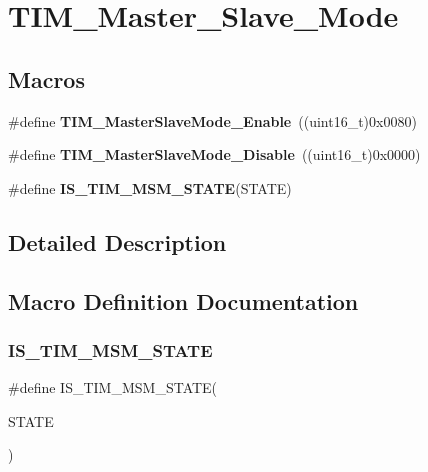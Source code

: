 \section{T\+I\+M\+\_\+\+Master\+\_\+\+Slave\+\_\+\+Mode}
\label{group__TIM__Master__Slave__Mode}
\subsection*{Macros}
\begin{DoxyCompactItemize}
\item 
\#define \textbf{ T\+I\+M\+\_\+\+Master\+Slave\+Mode\+\_\+\+Enable}~((uint16\+\_\+t)0x0080)
\item 
\#define \textbf{ T\+I\+M\+\_\+\+Master\+Slave\+Mode\+\_\+\+Disable}~((uint16\+\_\+t)0x0000)
\item 
\#define \textbf{ I\+S\+\_\+\+T\+I\+M\+\_\+\+M\+S\+M\+\_\+\+S\+T\+A\+TE}(S\+T\+A\+TE)
\end{DoxyCompactItemize}


\subsection{Detailed Description}


\subsection{Macro Definition Documentation}
\mbox{\label{group__TIM__Master__Slave__Mode_ga53146701cf287a0eca43b9232dffac60}} 
\subsubsection{I\+S\+\_\+\+T\+I\+M\+\_\+\+M\+S\+M\+\_\+\+S\+T\+A\+TE}
{\footnotesize\ttfamily \#define I\+S\+\_\+\+T\+I\+M\+\_\+\+M\+S\+M\+\_\+\+S\+T\+A\+TE(\begin{DoxyParamCaption}\item[{}]{S\+T\+A\+TE }\end{DoxyParamCaption})}

